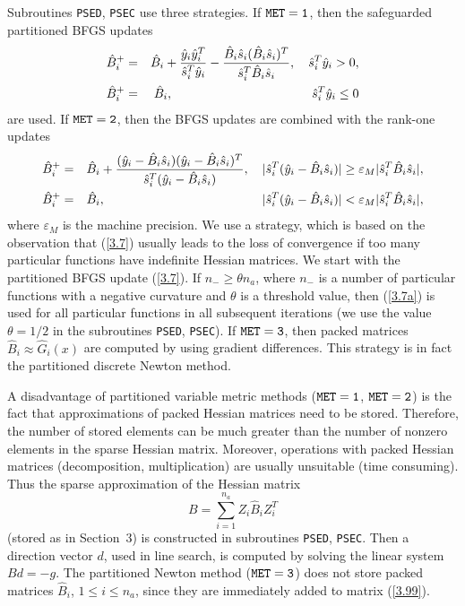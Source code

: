 \documentclass{esub2acm}
\newcommand{\be}{\begin{equation}}
\newcommand{\ee}{\end{equation}}
\begin{document}
Subroutines {\tt PSED}, {\tt PSEC} use three strategies.
If ${\tt MET=1}$, then the safeguarded partitioned BFGS updates
%
\begin{eqnarray}
\label{3.7} \hat{B}_i^+ & = & \hat{B}_i + \frac{\hat{y}_i \hat{y}_i^T}{\hat{s}_i^T \hat{y}_i} -
\frac{\hat{B}_i \hat{s}_i (\hat{B}_i  \hat{s}_i)^T}{\hat{s}_i^T \hat{B}_i \hat{s}_i},
\quad  \hat{s}_i^T \hat{y}_i > 0, \\
\hat{B}_i^+ & = & \hat{B}_i, \hspace{39mm} \hat{s}_i^T \hat{y}_i \leq 0 \nonumber
\end{eqnarray}
%
are used.
If ${\tt MET=2}$, then the BFGS updates are combined with the rank-one updates
%
\begin{eqnarray}
\label{3.7a}
\hat{B}_i^+ & = & \hat{B}_i + \frac{(\hat{y}_i - \hat{B}_i \hat{s}_i)
(\hat{y}_i - \hat{B}_i \hat{s}_i)^T}{\hat{s}_i^T (\hat{y}_i - \hat{B}_i \hat{s}_i)},
\quad |\hat{s}_i^T (\hat{y}_i - \hat{B}_i \hat{s}_i)| \geq
\varepsilon_M |\hat{s}_i^T \hat{B}_i \hat{s}_i|, \\
\hat{B}_i^+ & = & \hat{B}_i, \hspace{44mm} |\hat{s}_i^T (\hat{y}_i - \hat{B}_i \hat{s}_i)|
<  \varepsilon_M |\hat{s}_i^T \hat{B}_i \hat{s}_i|, \nonumber
\end{eqnarray}
%
where $\varepsilon_M$ is the machine precision. We use a strategy,
which is based on the observation that (\ref{3.7})
usually leads to the loss of convergence if too many particular functions
have indefinite Hessian matrices. We start with the partitioned BFGS
update (\ref{3.7}). If $n_- \geq \theta n_a$, where $n_-$ is a number of
particular functions with a negative curvature and $\theta$ is a threshold
value, then (\ref{3.7a}) is used for all particular functions in all
subsequent iterations (we use the value $\theta = 1/2$ in the subroutines
{\tt PSED}, {\tt PSEC}).
If ${\tt MET=3}$, then packed  matrices $\hat{B}_i \approx \hat{G}_i(x)$ are
computed by using gradient differences. This strategy is in fact
the partitioned discrete Newton method.

A disadvantage of partitioned variable metric methods (${\tt MET=1}$,
${\tt MET=2}$) is the fact that approximations of packed Hessian matrices
need to be stored. Therefore, the number of stored elements can be much
greater than the number of nonzero elements in the sparse Hessian matrix.
Moreover, operations with packed Hessian matrices (decomposition,
multiplication) are usually unsuitable (time consuming). Thus the
sparse approximation of the Hessian matrix
%
\be
B = \sum_{i=1}^{n_a} Z_i \hat{B}_i Z_i^T
\label{3.99}
\ee
%
(stored as in Section~3) is constructed in subroutines {\tt PSED}, {\tt PSEC}.
Then a direction vector $d$, used in line search, is computed by solving
the linear system $B d = -g$. The partitioned Newton method (${\tt MET=3}$)
does not store packed matrices $\hat{B}_i$, $1 \leq i \leq n_a$, since they
are immediately added to matrix (\ref{3.99}).
\end{document}
